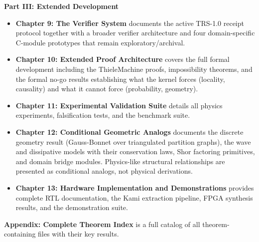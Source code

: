 \textbf{Part III: Extended Development}
\begin{itemize}
    \item \textbf{Chapter 9: The Verifier System} documents the active TRS-1.0 receipt protocol together with a broader verifier architecture and four domain-specific C-module prototypes that remain exploratory/archival.

    \item \textbf{Chapter 10: Extended Proof Architecture} covers the full formal development including the ThieleMachine proofs, impossibility theorems, and the formal no-go results establishing what the kernel forces (locality, causality) and what it cannot force (probability, geometry).

    \item \textbf{Chapter 11: Experimental Validation Suite} details all physics experiments, falsification tests, and the benchmark suite.

    \item \textbf{Chapter 12: Conditional Geometric Analogs} documents the discrete geometry result (Gauss-Bonnet over triangulated partition graphs), the wave and dissipative models with their conservation laws, Shor factoring primitives, and domain bridge modules. Physics-like structural relationships are presented as conditional analogs, not physical derivations.

    \item \textbf{Chapter 13: Hardware Implementation and Demonstrations} provides complete RTL documentation, the Kami extraction pipeline, FPGA synthesis results, and the demonstration suite.
\end{itemize}

\textbf{Appendix: Complete Theorem Index} is a full catalog of all theorem-containing files with their key results.

